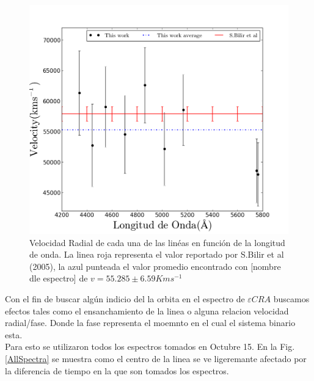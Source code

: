 \documentclass[Proceedings]{ascelike}
\begin{document}
\begin{figure}
\includegraphics[scale=0.5]{radialvelocity.png}
\caption{Velocidad Radial de cada una de las lin\'eas en funci\'on de la longitud de onda. La linea roja representa el valor reportado por S.Bilir et al (2005), la azul punteada el valor promedio encontrado con [nombre dle espectro] de $v=55.285 \pm 6.59 Kms^{-1}$\label{vradial}}
\end{figure}

Con el fin de buscar alg\'un indicio del la orbita en el espectro de $\varepsilon CRA$ buscamos efectos tales como 
el ensanchamiento de la linea o alguna relacion velocidad radial/fase. Donde la fase representa el moemnto en el cual el 
sistema binario esta.\\

Para esto se utilizaron todos los espectros tomados en Octubre 15. En la Fig.\ref{AllSpectra} se muestra como el centro de la linea se ve ligeremante afectado por la diferencia de tiempo en la que son tomados los espectros.\\
\end{document}
